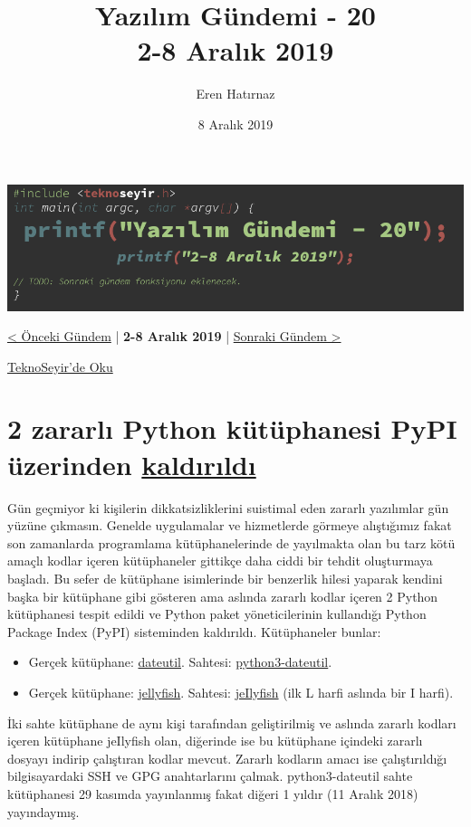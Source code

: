 \documentclass[11pt]{article}
\author{Eren Hatırnaz}
\date{8 Aralık 2019}
\title{Yazılım Gündemi - 20\\\medskip
\large 2-8 Aralık 2019}
\begin{document}
\maketitle
\tableofcontents \clearpage\shorthandoff{=}

\begin{center}
\includegraphics[width=.9\linewidth]{gorseller/yazilim-gundemi-banner.png}
\end{center}

\begin{center}
\href{../19/yazilim-gundemi-19.pdf}{< Önceki Gündem} | \textbf{2-8 Aralık 2019} | \href{../21/yazilim-gundemi-21.pdf}{Sonraki Gündem >}

\href{https://teknoseyir.com/blog/yazilim-gundemi-20-2-8-aralik-2019}{TeknoSeyir'de Oku}
\end{center}

\section{2 zararlı Python kütüphanesi PyPI üzerinden \href{https://www.zdnet.com/article/two-malicious-python-libraries-removed-from-pypi/}{kaldırıldı}}
\label{sec:org1de380c}
Gün geçmiyor ki kişilerin dikkatsizliklerini suistimal eden zararlı yazılımlar
gün yüzüne çıkmasın. Genelde uygulamalar ve hizmetlerde görmeye alıştığımız
fakat son zamanlarda programlama kütüphanelerinde de yayılmakta olan bu tarz
kötü amaçlı kodlar içeren kütüphaneler gittikçe daha ciddi bir tehdit
oluşturmaya başladı. Bu sefer de kütüphane isimlerinde bir benzerlik hilesi
yaparak kendini başka bir kütüphane gibi gösteren ama aslında zararlı kodlar
içeren 2 Python kütüphanesi tespit edildi ve Python paket yöneticilerinin
kullandığı Python Package Index (PyPI) sisteminden kaldırıldı. Kütüphaneler
bunlar:
\begin{itemize}
\item Gerçek kütüphane: \href{https://pypi.org/project/python-dateutil/}{dateutil}. Sahtesi: \href{https://pypi.org/project/python3-dateutil/}{python3-dateutil}.
\item Gerçek kütüphane: \href{https://pypi.org/project/jellyfish/}{jellyfish}. Sahtesi: \href{https://pypi.org/project/jeIlyfish/}{jeIlyfish} (ilk L harfi aslında bir I
harfi).
\end{itemize}
İki sahte kütüphane de aynı kişi tarafından geliştirilmiş ve aslında zararlı
kodları içeren kütüphane jeIlyfish olan, diğerinde ise bu kütüphane içindeki
zararlı dosyayı indirip çalıştıran kodlar mevcut. Zararlı kodların amacı ise
çalıştırıldığı bilgisayardaki SSH ve GPG anahtarlarını çalmak. python3-dateutil
sahte kütüphanesi 29 kasımda yayınlanmış fakat diğeri 1 yıldır (11 Aralık 2018)
yayındaymış.
\end{document}
